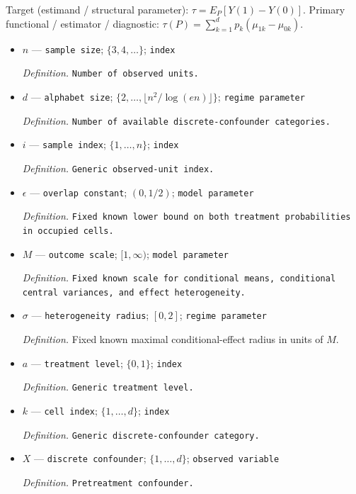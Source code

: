 \documentclass{article}
\begin{document}
Target (estimand / structural parameter): \(\tau=E_P[Y(1)-Y(0)]\).
Primary functional / estimator / diagnostic: \(\tau(P)=\sum_{k=1}^dp_k(\mu_{1k}-\mu_{0k})\).
\begin{itemize}
  \item \(n\) --- \texttt{sample size}; \(\{3,4,\ldots\}\); \texttt{index}
  \par\smallskip\noindent\emph{Definition.} \texttt{Number of observed units.}
  \item \(d\) --- \texttt{alphabet size}; \(\{2,\ldots,\lfloor n^2/\log(en)\rfloor\}\); \texttt{regime parameter}
  \par\smallskip\noindent\emph{Definition.} \texttt{Number of available discrete-\allowbreak{}confounder categories.}
  \item \(i\) --- \texttt{sample index}; \(\{1,\ldots,n\}\); \texttt{index}
  \par\smallskip\noindent\emph{Definition.} \texttt{Generic observed-\allowbreak{}unit index.}
  \item \(\epsilon\) --- \texttt{overlap constant}; \((0,1/2)\); \texttt{model parameter}
  \par\smallskip\noindent\emph{Definition.} \texttt{Fixed known lower bound on both treatment probabilities in occupied cells.}
  \item \(M\) --- \texttt{outcome scale}; \([1,\infty)\); \texttt{model parameter}
  \par\smallskip\noindent\emph{Definition.} \texttt{Fixed known scale for conditional means,\allowbreak{} conditional central variances,\allowbreak{} and effect heterogeneity.}
  \item \(\sigma\) --- \texttt{heterogeneity radius}; \([0,2]\); \texttt{regime parameter}
  \par\smallskip\noindent\emph{Definition.} Fixed known maximal conditional-effect radius in units of \(M\).
  \item \(a\) --- \texttt{treatment level}; \(\{0,1\}\); \texttt{index}
  \par\smallskip\noindent\emph{Definition.} \texttt{Generic treatment level.}
  \item \(k\) --- \texttt{cell index}; \(\{1,\ldots,d\}\); \texttt{index}
  \par\smallskip\noindent\emph{Definition.} \texttt{Generic discrete-\allowbreak{}confounder category.}
  \item \(X\) --- \texttt{discrete confounder}; \(\{1,\ldots,d\}\); \texttt{observed variable}
  \par\smallskip\noindent\emph{Definition.} \texttt{Pretreatment confounder.}

\end{itemize}
\end{document}
